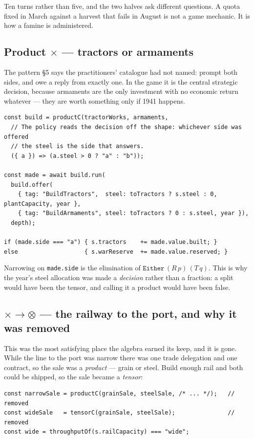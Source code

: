 \documentclass[11pt,a4paper]{article}
\begin{document}
\noindent Ten turns rather than five, and the two halves ask different
questions. A quota fixed in March against a harvest that fails in August is not
a game mechanic. It is how a famine is administered.

\subsection{Product $\times$ --- tractors or armaments}

The pattern \S5 says the practitioners' catalogue had not named: prompt both
sides, and owe a reply from exactly one. In the game it is the central
strategic decision, because armaments are the only investment with no economic
return whatever --- they are worth something only if 1941 happens.

\begin{lstlisting}[language=TS]
const build = productC(tractorWorks, armaments,
  // The policy reads the decision off the shape: whichever side was offered
  // the steel is the side that answers.
  ({ a }) => (a.steel > 0 ? "a" : "b"));

const made = await build.run(
  build.offer(
    { tag: "BuildTractors",  steel: toTractors ? s.steel : 0, plantCapacity, year },
    { tag: "BuildArmaments", steel: toTractors ? 0 : s.steel, year }),
  depth);

if (made.side === "a") { s.tractors    += made.value.built; }
else                   { s.warReserve  += made.value.reserved; }
\end{lstlisting}

\noindent Narrowing on \verb|made.side| is the elimination of
$\texttt{Either}\,(R\,p)\,(T\,q)$. This is why the year's steel allocation was
made a \emph{decision} rather than a fraction: a split would have been the
tensor, and calling it a product would have been false.

\subsection{$\times \to \otimes$ --- the railway to the port, and why it was removed}

This was the most satisfying place the algebra earned its keep, and it is
gone. While the line to the port was narrow there was one trade delegation and
one contract, so the sale was a \emph{product} --- grain or steel. Build enough
rail and both could be shipped, so the sale became a \emph{tensor}:

\begin{lstlisting}[language=TS]
const narrowSale = productC(grainSale, steelSale, /* ... */);   // removed
const wideSale   = tensorC(grainSale, steelSale);               // removed
const wide = throughputOf(s.railCapacity) === "wide";
\end{lstlisting}
\end{document}
